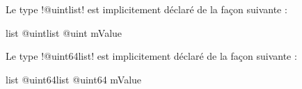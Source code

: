 Le type \ggs!@uintlist! est implicitement déclaré de la façon suivante :

\begin{galgasbox}
list @uintlist {
  @uint mValue
}
\end{galgasbox}







Le type \ggs!@uint64list! est implicitement déclaré de la façon suivante :

\begin{galgasbox}
list @uint64list {
  @uint64 mValue
}
\end{galgasbox}

